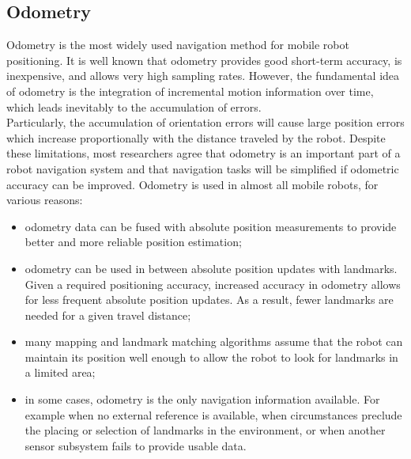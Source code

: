 \subsection{Odometry}
\label{intro:mobile:odometry}

Odometry is the most widely used navigation method for mobile robot
positioning. It is well known that odometry provides good short-term
accuracy, is inexpensive, and allows very high sampling rates. However,
the fundamental idea of odometry is the integration of incremental motion
information over time, which leads inevitably to the accumulation of errors.
\\
Particularly, the accumulation of orientation errors will cause large
position errors which increase proportionally with the distance traveled
by the robot. Despite these limitations, most researchers agree that odometry
is an important part of a robot navigation system and that navigation tasks
will be simplified if odometric accuracy can be improved. Odometry is used
in almost all mobile robots, for various reasons:

\begin{itemize}
\item odometry data can be fused with absolute
  position measurements to provide better and more
  reliable position estimation;
\item odometry can be used in between absolute position updates with
  landmarks. Given a required positioning accuracy, increased accuracy
  in odometry allows for less frequent absolute position updates. As
  a result, fewer landmarks are needed for a given travel distance;
\item many mapping and landmark matching algorithms assume that the robot
  can maintain its position well enough to allow the robot to look for
  landmarks in a limited area;
\item in some cases, odometry is the only navigation information available.
  For example when no external reference is available, when circumstances
  preclude the placing or selection of landmarks in the environment,
  or when another sensor subsystem fails to provide usable data.
\end{itemize}

